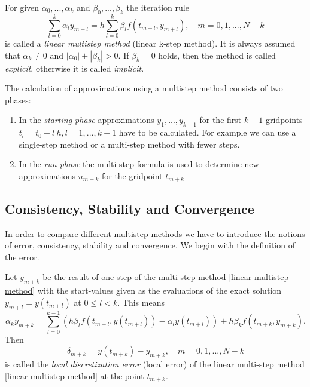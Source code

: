 	\begin{definition}
		\label{def:multi step method}
		For given $\alpha_0, ..., \alpha_k$ and $\beta_0, ..., \beta_k$ the iteration rule
		\begin{equation}
			\label{linear-multistep-method}
			\sum_{l=0}^{k} \alpha_l y_{m+l} = h \sum_{l=0}^{k} \beta_l f(t_{m+l}, y_{m+l}), \quad m=0,1,...,N-k
		\end{equation}
		is called a \emph{linear multistep method} (linear k-step method). It is always assumed that $\alpha_k \neq 0$ and $|\alpha_0| + |\beta_k| > 0$. If $\beta_k=0$ holds, then the method is called \emph{explicit}, otherwise it is called \emph{implicit}.
	\end{definition}
	
	The calculation of approximations using a multistep method consists of two phases:
	\begin{enumerate}
		\item In the \emph{starting-phase} approximations $y_1,...,y_{k-1}$ for the first $k-1$ gridpoints $t_l = t_0+l\ h, l=1,...,k-1$ have to be calculated. For example we can use a single-step method or a multi-step method with fewer steps.
		
		\item  In the \emph{run-phase} the multi-step formula is used to determine new approximations $u_{m+k}$ for the gridpoint $t_{m+k}$
	\end{enumerate}
	

	
	\subsection{Consistency, Stability and Convergence}
	
	In order to compare different multistep methods we have to introduce the notions of error, consistency, stability and convergence. We begin with the definition of the error.
	\begin{definition}
		Let $y_{m+k}$ be the result of one step of the multi-step method \eqref{linear-multistep-method} with the start-values given as the evaluations of the exact solution $y_{m+l} = y(t_{m+l})$ at $0 \leq l < k$. This means
		\begin{displaymath}
			\alpha_k y_{m+k} = \sum_{l=0}^{k-1} \left( h \beta_l f(t_{m+l}, y(t_{m+l})) - \alpha_l y(t_{m+l}) \right) + h \beta_k f(t_{m+k}, y_{m+k}) .
		\end{displaymath}
		Then
		\begin{displaymath}
			\delta_{m+k} = y(t_{m+k}) - y_{m+k}, \quad m=0,1,...,N-k
		\end{displaymath}
		is called the \emph{local discretization error} (local error) of the linear multi-step method \eqref{linear-multistep-method} at the point $t_{m+k}$.
	\end{definition}
	
